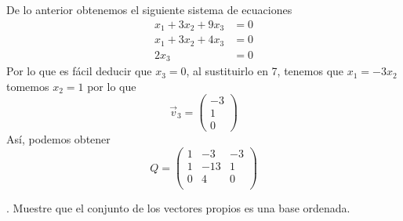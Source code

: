 \documentclass[letterpaper]{article}
\renewcommand{\*}{\cdot}
\theoremstyle{definition}
\begin{document}
De lo anterior obtenemos el siguiente sistema de ecuaciones
\begin{align}
	x_1 + 3x_2 + 9x_3 &= 0\\
	x_1 + 3x_2 +4x_3 &= 0\\
	2x_3 &= 0
\end{align}
Por lo que es fácil deducir que $ x_3 = 0 $, al sustituirlo en 7, tenemos que $ x_1 = -3x_2$ tomemos $ x_2 = 1 $
por lo que \[ \vec{v}_3 = \begin{pmatrix}
-3\\
1\\
0
\end{pmatrix} \]
Así, podemos obtener \[ Q = \begin{pmatrix}
1 & -3 & -3\\
1 & -13 & 1\\
0 & 4 & 0\\
\end{pmatrix}\]

. Muestre que el conjunto de los vectores propios es una base ordenada.
\end{document}
